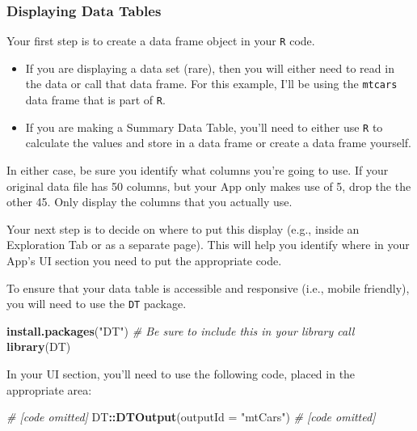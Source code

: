 \documentclass[
]{book}
\newenvironment{Shaded}{\begin{snugshade}}{\end{snugshade}}
\newcommand{\CommentTok}[1]{\textcolor[rgb]{0.56,0.35,0.01}{\textit{#1}}}
\newcommand{\DataTypeTok}[1]{\textcolor[rgb]{0.13,0.29,0.53}{#1}}
\newcommand{\KeywordTok}[1]{\textcolor[rgb]{0.13,0.29,0.53}{\textbf{#1}}}
\newcommand{\NormalTok}[1]{#1}
\newcommand{\OperatorTok}[1]{\textcolor[rgb]{0.81,0.36,0.00}{\textbf{#1}}}
\newcommand{\StringTok}[1]{\textcolor[rgb]{0.31,0.60,0.02}{#1}}
\providecommand{\tightlist}{%
  \setlength{\itemsep}{0pt}\setlength{\parskip}{0pt}}
\begin{document}
\hypertarget{displaying-data-tables}{%
\subsubsection{Displaying Data Tables}\label{displaying-data-tables}}

Your first step is to create a data frame object in your \texttt{R} code.

\begin{itemize}
\tightlist
\item
  If you are displaying a data set (rare), then you will either need to read in the data or call that data frame. For this example, I'll be using the \texttt{mtcars} data frame that is part of \texttt{R}.
\item
  If you are making a Summary Data Table, you'll need to either use \texttt{R} to calculate the values and store in a data frame or create a data frame yourself.
\end{itemize}

In either case, be sure you identify what columns you're going to use. If your original data file has 50 columns, but your App only makes use of 5, drop the the other 45. Only display the columns that you actually use.

Your next step is to decide on where to put this display (e.g., inside an Exploration Tab or as a separate page). This will help you identify where in your App's UI section you need to put the appropriate code.

To ensure that your data table is accessible and responsive (i.e., mobile friendly), you will need to use the \texttt{DT} package.

\begin{Shaded}
\begin{Highlighting}[]
\KeywordTok{install.packages}\NormalTok{(}\StringTok{"DT"}\NormalTok{)}
\CommentTok{# Be sure to include this in your library call}
\KeywordTok{library}\NormalTok{(DT)}
\end{Highlighting}
\end{Shaded}

In your UI section, you'll need to use the following code, placed in the appropriate area:

\begin{Shaded}
\begin{Highlighting}[]
\CommentTok{# [code omitted]}
\NormalTok{DT}\OperatorTok{::}\KeywordTok{DTOutput}\NormalTok{(}\DataTypeTok{outputId =} \StringTok{"mtCars"}\NormalTok{)}
\CommentTok{# [code omitted]}
\end{Highlighting}
\end{Shaded}
\end{document}

